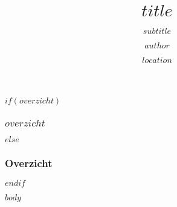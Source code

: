 \documentclass[$fontsize$, xetex]{beamer}
\title{$title$}
\subtitle{$subtitle$}
\author{$author$}
\institute{$institute$}
\date{$location$}
\date{}
\begin{document}
\begin{frame}[plain]
  \titlepage
\end{frame}

\begin{frame}
$if(overzicht)$
  \frametitle{$overzicht$}
$else$
  \frametitle{Overzicht}
$endif$
	\tableofcontents
\end{frame}

$body$
\end{document}
